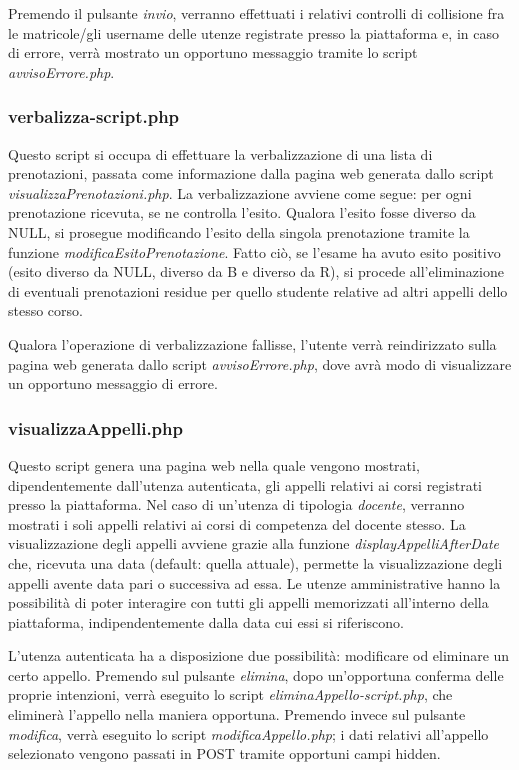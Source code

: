 \documentclass [a4paper,11pt]{book}
\begin{document}
Premendo il pulsante \emph{invio}, verranno effettuati i relativi controlli di collisione fra le matricole/gli username delle utenze registrate presso la piattaforma e, in caso di errore, verrà mostrato un opportuno messaggio tramite lo script \emph{avvisoErrore.php}.

\medskip

\subsubsection{verbalizza-script.php}

Questo script si occupa di effettuare la verbalizzazione di una lista di prenotazioni, passata come informazione dalla pagina web generata dallo script \emph{visualizzaPrenotazioni.php}. La verbalizzazione avviene come segue: per ogni prenotazione ricevuta, se ne controlla l'esito. Qualora l'esito fosse diverso da NULL, si prosegue modificando l'esito della singola prenotazione tramite la funzione \emph{modificaEsitoPrenotazione}. Fatto ciò, se l'esame ha avuto esito positivo (esito diverso da NULL, diverso da B e diverso da R), si procede all'eliminazione di eventuali prenotazioni residue per quello studente relative ad altri appelli dello stesso corso.

Qualora l'operazione di verbalizzazione fallisse, l'utente verrà reindirizzato sulla pagina web generata dallo script \emph{avvisoErrore.php}, dove avrà modo di visualizzare un opportuno messaggio di errore. 

\medskip

\subsubsection{visualizzaAppelli.php}

Questo script genera una pagina web nella quale vengono mostrati, dipendentemente dall'utenza autenticata, gli appelli relativi ai corsi registrati presso la piattaforma. Nel caso di un'utenza di tipologia \emph{docente}, verranno mostrati i soli appelli relativi ai corsi di competenza del docente stesso. La visualizzazione degli appelli avviene grazie alla funzione \emph{displayAppelliAfterDate} che, ricevuta una data (default: quella attuale), permette la visualizzazione degli appelli avente data pari o successiva ad essa. Le utenze amministrative hanno la possibilità di poter interagire con tutti gli appelli memorizzati all'interno della piattaforma, indipendentemente dalla data cui essi si riferiscono.

L'utenza autenticata ha a disposizione due possibilità: modificare od eliminare un certo appello. Premendo sul pulsante \emph{elimina}, dopo un'opportuna conferma delle proprie intenzioni, verrà eseguito lo script \emph{eliminaAppello-script.php}, che eliminerà l'appello nella maniera opportuna. Premendo invece sul pulsante \emph{modifica}, verrà eseguito lo script \emph{modificaAppello.php}; i dati relativi all'appello selezionato vengono passati in POST tramite opportuni campi hidden.
\end{document}
